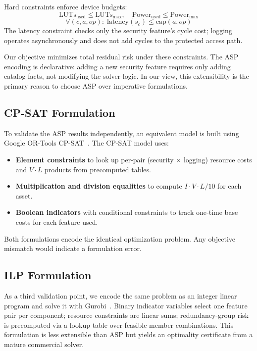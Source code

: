 \documentclass[conference]{IEEEtran}
\begin{document}
Hard constraints enforce device budgets:
\begin{equation}
\text{LUTs}_{\text{used}}\leq \text{LUTs}_{\max},\quad
\text{Power}_{\text{used}}\leq \text{Power}_{\max}
\end{equation}
\begin{equation}
\forall(c,a,op): \; \text{latency}(s_c)\leq \text{cap}(a,op)
\end{equation}
The latency constraint checks only the security feature's cycle cost;
logging operates asynchronously and does not add cycles to the
protected access path.

Our objective minimizes total residual risk under these constraints.
The ASP encoding is declarative: adding a new security feature requires
only adding catalog facts, not modifying the solver logic. In our view,
this extensibility is the primary reason to choose ASP over imperative
formulations.

\subsection{CP-SAT Formulation}

To validate the ASP results independently, an equivalent model is built
using Google OR-Tools CP-SAT~\cite{ortools}. The CP-SAT model uses:
\begin{itemize}
\item \textbf{Element constraints} to look up per-pair (security $\times$
logging) resource costs and $V \cdot L$ products from precomputed tables.
\item \textbf{Multiplication and division equalities} to compute
$I \cdot V \cdot L / 10$ for each asset.
\item \textbf{Boolean indicators} with conditional constraints to track
one-time base costs for each feature used.
\end{itemize}

Both formulations encode the identical optimization problem. Any
objective mismatch would indicate a formulation error.

\subsection{ILP Formulation}

As a third validation point, we encode the same problem as an
integer linear program and solve it with Gurobi~\cite{gurobi}.
Binary indicator variables select one feature pair per component;
resource constraints are linear sums; redundancy-group risk is
precomputed via a lookup table over feasible member combinations.
This formulation is less extensible than ASP but yields
an optimality certificate from a mature commercial solver.
\end{document}
